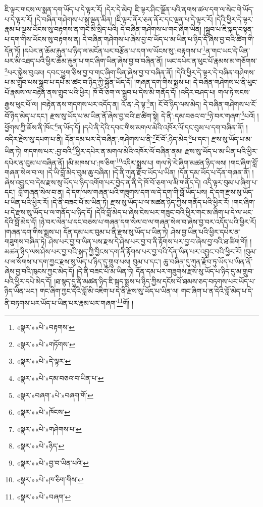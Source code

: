 ཇི་ལྟར་གངས་ལ་སྨན་དག་ཡོད་པ་དེ་ལྟར་རོ། །དེར་དེ་མེད། ཇི་ལྟར་ཤིང་ལྗོན་པའི་ནགས་ཚལ་དག་ལ་སེང་གེ་ཡོད་པ་དེ་ལྟར་རོ། །དེ་བཞིན་གཤེགས་པ་སྐུ་ལྡན་མིན། །ཇི་ལྟར་ནོར་ཅན་ནོར་དང་ལྡན་པ་དེ་ལྟར་རོ། །དེའི་ཕྱིར་དེ་ལྟར་རྣམ་པ་ལྔས་ཡོངས་སུ་བརྟགས་ན་གང་མི་སྲིད་པའི། དེ་བཞིན་གཤེགས་པ་གང་ཞིག་ཡིན། །སྒྲུབ་པ་ཇི་སྐད་བསྟན་པ་དག་གིས་ཡོངས་སུ་བརྟགས་ན། དེ་བཞིན་གཤེགས་པ་ཞེས་བྱ་བ་ཡོད་པ་མ་ཡིན་པ་ཉིད་དོ་ཞེས་བྱ་བའི་ཚིག་གི་དོན་ཏོ། །དཔེར་ན་ཆོམ་རྐུན་པ་ཉིད་ལ་མངོན་པར་བརྩོན་པ་དག་ལ་ཡོངས་སུ་:བརྟགས་པ་\footnote{«སྣར་»«པེ་»བརྟགས་}ན་གང་ཡང་དེ་ཡིན་པར་མི་འཐད་པའི་ཕྱིར་ཆོམ་རྐུན་པ་གང་ཞིག་ཡིན་ཞེས་བྱ་བ་བཞིན་ནོ། །ཡང་དཔེར་ན་ཕུང་པོ་རྣམས་མ་གཅོགས་\footnote{«སྣར་»«པེ་»གཏོགས་}པར་སྐྱེས་བུའམ། དབང་ཕྱུག་ཅིས་བྱ་བ་གང་ཞིག་ཡིན་ཞེས་བྱ་བ་བཞིན་ནོ། །དེའི་ཕྱིར་དེ་ལྟར་དེ་བཞིན་གཤེགས་པ་མ་གྲུབ་པས་སྒྲུབ་པ་དཔེ་མ་ཚང་བ་ཉིད་ཀྱི་སྐྱོན་ཡོད་དོ། །གཞན་དག་གིས་སྨྲས་པ། དེ་བཞིན་གཤེགས་པ་ནི་ཕུང་པོ་རྣམས་ལ་བརྟེན་ནས་གྲུབ་པའི་ཕྱིར། ཁོ་བོ་ཅག་ལ་སྒྲུབ་པ་དེས་མི་གནོད་དོ། །འདིར་བཤད་པ། གལ་ཏེ་སངས་རྒྱས་ཕུང་པོ་ལ། །བརྟེན་ནས་གདགས་པར་འདོད་ན། འོ་ན་:དེ་ལྟ་\footnote{«སྣར་»«པེ་»དེ་ལྟར་}ན། ངོ་བོ་ཉིད་ལས་མེད། དེ་བཞིན་གཤེགས་པ་ངོ་བོ་ཉིད་མེད་པ་དང་། རྫས་སུ་ཡོད་པ་མ་ཡིན་ནོ་ཞེས་བྱ་བའི་ཐ་ཚིག་སྟེ། དེ་ནི་:དམ་བཅའ་བ་\footnote{«སྣར་»«པེ་»དམ་བཅའ་བ་ཡིན་པ་}ཉེ་བར་གཞག་\footnote{«སྣར་»བཞག་«པེ་»བཞག་གོ་}པའོ། །ཕྱོགས་ཀྱི་ཆོས་ནི་ཁོང་\footnote{«སྣར་»«པེ་»ཁོངས་}ན་ཡོད་དོ། །དཔེ་ནི་དེའི་དབང་གིས་མགལ་མེའི་འཁོར་ལོ་དང་བུམ་པ་དག་བཞིན་ནོ། །འདིར་རྗེས་སུ་དཔག་པ་ནི། དོན་དམ་པར་དེ་བཞིན་:གཤེགས་པ་ནི་\footnote{«སྣར་»«པེ་»གཤེགས་པ་}ངོ་བོ་:ཉིད་མེད་\footnote{«སྣར་»«པེ་»ཉིད་}པ་དང་། རྫས་སུ་ཡོད་པ་མ་ཡིན་ཏེ། གདགས་པར་:བྱ་བའི་\footnote{«སྣར་»«པེ་»བྱ་བ་ཡིན་པའི་}ཕྱིར་དཔེར་ན་མགལ་མེའི་འཁོར་ལོ་བཞིན་ནམ། རྫས་སུ་ཡོད་པ་མ་ཡིན་པའི་ཕྱིར་དཔེར་ན་བུམ་པ་བཞིན་ནོ། །མི་མཁས་པ་:ཁ་ཅིག་\footnote{«སྣར་»«པེ་»ཁ་ཅིག་གིས་}འདིར་སྨྲས་པ། གལ་ཏེ་རེ་ཞིག་མཚན་ཉིད་ལས། །གང་ཞིག་བློ་གཞན་སེལ་བ་ལ། །དེ་ཡི་བློ་མེད་བུམ་ཆུ་བཞིན། །དེ་ནི་ཀུན་རྫོབ་ཡོད་པ་ཡིན། །དོན་དམ་ཡོད་པ་དོན་གཞན་ནོ། །ཞེས་འབྱུང་བ་དེས་རྫས་སུ་ཡོད་པ་ཉིད་འགོག་པར་བྱེད་ན་ནི་དེ་ཁོ་བོ་ཅག་ལ་མི་གནོད་དེ། འདི་ལྟར་བུམ་པ་ཞིག་པ་དང་། བློ་གཞན་སེལ་བ་ན། དེ་དག་ལས་གཞན་པའི་གཟུགས་དག་ལ་དེ་དག་གི་བློ་ཡོད་པས། དེ་དག་རྫས་སུ་ཡོད་པ་ཡིན་པའི་ཕྱིར་རོ། །དེ་ནི་བཟང་པོ་མ་ཡིན་ཏེ། རྫས་སུ་ཡོད་པ་ལ་མཚན་ཉིད་ཀྱིས་གནོད་པའི་ཕྱིར་རོ། །གང་ཞིག་པ་དེ་རྫས་སུ་ཡོད་པ་ལ་གནོད་པ་ཉིད་དོ། །དེའི་བློ་མེད་པ་ཞེས་ངེས་པར་གཟུང་བའི་ཕྱིར་གང་མ་ཞིག་པ་དེ་ལ་ཡང་དེའི་བློ་མེད་དོ། །ཉེ་བར་ལེན་པ་དང་བཅས་པ་གཞན་དག་སེལ་བ་ལ་གཞན་སེལ་བ་ཞེས་བྱ་བར་འདོད་པའི་ཕྱིར་རོ། །གཞན་དག་གིས་སྨྲས་པ། དོན་དམ་པར་བུམ་པ་ནི་རྫས་སུ་ཡོད་པ་ཡིན་ཏེ། ཤེས་བྱ་ཡིན་པའི་ཕྱིར་དཔེར་ན་གཟུགས་བཞིན་ཏེ། ཤེས་པར་བྱ་བ་ཡིན་པས་རྫས་དེ་ཤེས་པར་བྱ་བ་ནི་རྟོགས་པར་བྱ་བ་ཞེས་བྱ་བའི་ཐ་ཚིག་གོ། །མཚན་ཉིད་ལས་ཤེས་པར་བྱ་བའི་སྐད་ཀྱི་བྱིངས་དག་ནི་རྟོགས་པར་བྱ་བའི་དོན་ཡིན་པར་འབྱུང་བའི་ཕྱིར་རོ། །བུམ་པ་ལ་སོགས་པ་དག་ཀྱང་རྫས་སུ་ཡོད་པ་ཉིད་དུ་གྲུབ་པས། བུམ་པ་དང་། ཆུ་བཞིན་དུ་ཀུན་རྫོབ་ཏུ་ཡོད་པ་ཡིན་ནོ་ཞེས་བྱ་བའི་ཁུངས་ཀྱང་མེད་དོ། །དེ་ནི་བཟང་པོ་མ་ཡིན་ཏེ། དོན་དམ་པར་གཟུགས་རྫས་སུ་ཡོད་པ་ཉིད་དུ་མ་གྲུབ་པའི་ཕྱིར་དཔེ་མེད་དོ། །ཐ་སྙད་དུ་ནི་མཚན་ཉིད་ཇི་སྐད་སྨྲས་པ་ཉིད་ཀྱིས་དངོས་པོ་ཐམས་ཅད་བཏགས་པར་ཡོད་པ་ཉིད་ཡིན་ཡང་། གང་ཞིག་ཀྱང་དེའི་བློ་མི་འཇིག་པ་དེ་ནི་རྫས་སུ་ཡོད་པ་ཡིན་ལ། གང་ཞིག་པ་ན་དེའི་བློ་མེད་པ་དེ་ནི་བཏགས་པར་ཡོད་པ་ཡིན་པར་རྣམ་པར་གཞག་\footnote{«སྣར་»«པེ་»བཞག་}གོ། །
